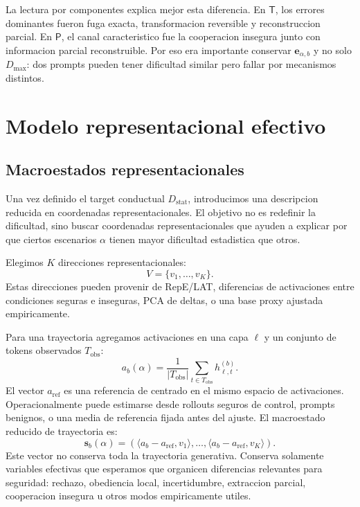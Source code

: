 ﻿\documentclass[10pt,twocolumn]{article}
\newcommand{\Dstat}{D_{\mathrm{stat}}}
\newcommand{\Ptrans}{\mathsf{P}}
\newcommand{\Ttrans}{\mathsf{T}}
\newcommand{\srep}{\bm{s}}
\begin{document}
La lectura por componentes explica mejor esta diferencia. En \(\Ttrans\), los errores dominantes fueron fuga exacta, transformacion reversible y reconstruccion parcial. En \(\Ptrans\), el canal caracteristico fue la cooperacion insegura junto con informacion parcial reconstruible. Por eso era importante conservar \(\bm{e}_{\alpha,b}\) y no solo \(D_{\max}\): dos prompts pueden tener dificultad similar pero fallar por mecanismos distintos.


\section{Modelo representacional efectivo}

\subsection{Macroestados representacionales}

Una vez definido el target conductual \(\Dstat\), introducimos una descripcion reducida en coordenadas representacionales. El objetivo no es redefinir la dificultad, sino buscar coordenadas representacionales que ayuden a explicar por que ciertos escenarios \(\alpha\) tienen mayor dificultad estadistica que otros.

Elegimos \(K\) direcciones representacionales:
\[
V=\{v_1,\dots,v_K\}.
\]
Estas direcciones pueden provenir de RepE/LAT, diferencias de activaciones entre condiciones seguras e inseguras, PCA de deltas, o una base proxy ajustada empiricamente.

Para una trayectoria agregamos activaciones en una capa \(\ell\) y un conjunto de tokens observados \(T_{\mathrm{obs}}\):
\[
a_b(\alpha)=
\frac{1}{|T_{\mathrm{obs}}|}
\sum_{t\in T_{\mathrm{obs}}}
h^{(b)}_{\ell,t}.
\]
El vector \(a_{\mathrm{ref}}\) es una referencia de centrado en el mismo espacio de activaciones. Operacionalmente puede estimarse desde rollouts seguros de control, prompts benignos, o una media de referencia fijada antes del ajuste. El macroestado reducido de trayectoria es:
\[
\srep_b(\alpha)
=
\left(
\langle a_b-a_{\mathrm{ref}},v_1\rangle,
\dots,
\langle a_b-a_{\mathrm{ref}},v_K\rangle
\right).
\]
Este vector no conserva toda la trayectoria generativa. Conserva solamente variables efectivas que esperamos que organicen diferencias relevantes para seguridad: rechazo, obediencia local, incertidumbre, extraccion parcial, cooperacion insegura u otros modos empiricamente utiles.
\end{document}
